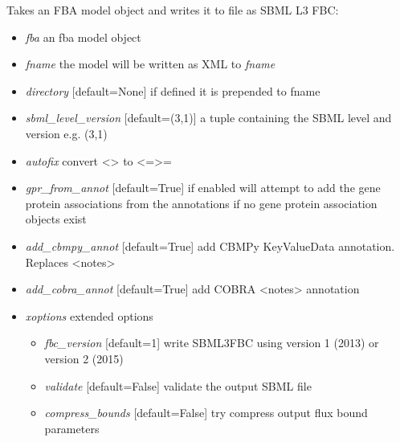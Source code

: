 \documentclass[a4paper,11pt,english]{sphinxmanual}
\begin{document}
\begin{fulllineitems}
\label{modules_doc:cbmpy.CBWrite.writeSBML3FBC}
Takes an FBA model object and writes it to file as SBML L3 FBC:
\begin{itemize}
\item {} 
\emph{fba} an fba model object

\item {} 
\emph{fname} the model will be written as XML to \emph{fname}

\item {} 
\emph{directory} {[}default=None{]} if defined it is prepended to fname

\item {} 
\emph{sbml\_level\_version} {[}default=(3,1){]} a tuple containing the SBML level and version e.g. (3,1)

\item {} 
\emph{autofix} convert \textless{}\textgreater{} to \textless{}=\textgreater{}=

\item {} 
\emph{gpr\_from\_annot} {[}default=True{]} if enabled will attempt to add the gene protein associations from the annotations
if no gene protein association objects exist

\item {} 
\emph{add\_cbmpy\_annot} {[}default=True{]} add CBMPy KeyValueData annotation. Replaces \textless{}notes\textgreater{}

\item {} 
\emph{add\_cobra\_annot} {[}default=True{]} add COBRA \textless{}notes\textgreater{} annotation

\item {} 
\emph{xoptions} extended options
\begin{itemize}
\item {} 
\emph{fbc\_version} {[}default=1{]} write SBML3FBC using version 1 (2013) or version 2 (2015)

\item {} 
\emph{validate} {[}default=False{]} validate the output SBML file

\item {} 
\emph{compress\_bounds} {[}default=False{]} try compress output flux bound parameters

\end{itemize}

\end{itemize}

\end{fulllineitems}
\end{document}
